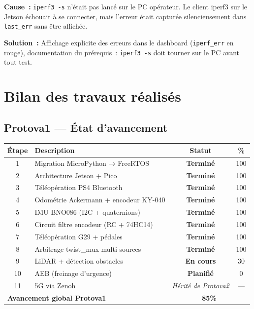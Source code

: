 \documentclass[a4paper,11pt]{article}
\begin{document}
\textbf{Cause~:} \texttt{iperf3 -s} n'était pas lancé sur le PC opérateur. Le client
iperf3 sur le Jetson échouait à se connecter, mais l'erreur était capturée
silencieusement dans \texttt{last\_err} sans être affichée.

\textbf{Solution~:} Affichage explicite des erreurs dans le dashboard
(\texttt{iperf\_err} en rouge), documentation du prérequis~:
\texttt{iperf3 -s} doit tourner sur le PC avant tout test.


\newpage
\section{Bilan des travaux réalisés}

\subsection{Protova1 — État d'avancement}

\begin{center}
\begin{tabularx}{\textwidth}{@{}cXcc@{}}
\toprule
\textbf{Étape} & \textbf{Description} & \textbf{Statut} & \textbf{\%} \\
\midrule
1 & Migration MicroPython → FreeRTOS & \textcolor{success}{\textbf{Terminé}} & 100 \\
2 & Architecture Jetson + Pico & \textcolor{success}{\textbf{Terminé}} & 100 \\
3 & Téléopération PS4 Bluetooth & \textcolor{success}{\textbf{Terminé}} & 100 \\
4 & Odométrie Ackermann + encodeur KY-040 & \textcolor{success}{\textbf{Terminé}} & 100 \\
5 & IMU BNO086 (I2C + quaternions) & \textcolor{success}{\textbf{Terminé}} & 100 \\
6 & Circuit filtre encodeur (RC + 74HC14) & \textcolor{success}{\textbf{Terminé}} & 100 \\
7 & Téléopération G29 + pédales & \textcolor{success}{\textbf{Terminé}} & 100 \\
8 & Arbitrage twist\_mux multi-sources & \textcolor{success}{\textbf{Terminé}} & 100 \\
9 & LiDAR + détection obstacles & \textcolor{warning}{\textbf{En cours}} & 30 \\
10 & AEB (freinage d'urgence) & \textcolor{warning}{\textbf{Planifié}} & 0 \\
11 & 5G via Zenoh & \textit{Hérité de Protova2} & — \\
\midrule
\multicolumn{2}{l}{\textbf{Avancement global Protova1}} & \multicolumn{2}{c}{\textbf{85\%}} \\
\bottomrule
\end{tabularx}
\end{center}
\end{document}
